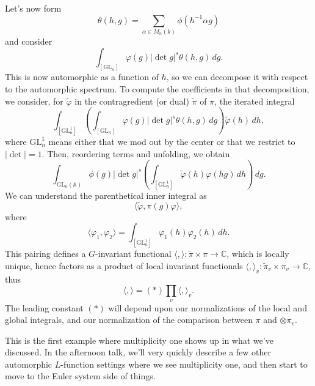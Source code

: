 \documentclass[reqno]{amsart} 
\begin{document}
Let's now form
\begin{equation*}
  \theta(h, g) = \sum_{\alpha \in M_n(k)} \phi(h^{-1} \alpha g)
\end{equation*}
and consider
\begin{equation*}
  \int_{[\mathrm{GL}_n]} \varphi(g) \lvert \det g \rvert^s \theta(h, g) \, d g.
\end{equation*}
This is now automorphic as a function of $h$, so we can decompose it with respect to the automorphic spectrum.  To compute the coefficients in that decomposition, we consider, for $\tilde{\varphi}$ in the contragredient (or dual) $\tilde{\pi}$ of $\pi$, the iterated integral
\begin{equation*}
  \int_{[\mathrm{GL}_n^1]}
  \left(  \int_{[\mathrm{GL}_n]} \varphi(g) \lvert \det g \rvert^s \theta(h, g) \, d g \right)
  \tilde{\varphi}(h) \, d h,
\end{equation*}
where $\mathrm{GL}_n^1$ means either that we mod out by the center or that we restrict to $\lvert \det \rvert = 1$.  Then, reordering terms and unfolding, we obtain
\begin{equation*}
  \int_{\mathrm{GL}_n(\mathbb{A})} \phi(g) \lvert \det g \rvert^s
  \left( \int_{[\mathrm{GL}_n^1]} \tilde{\varphi}(h)
    \varphi(h g) \,d h
  \right) \, d g.
\end{equation*}
We can understand the parenthetical inner integral as
\begin{equation*}
  \langle \tilde{\varphi}, \pi(g) \varphi \rangle,
\end{equation*}
where
\begin{equation*}
  \langle \varphi_1, \varphi_2 \rangle = \int_{[\mathrm{GL}_n^1]} \varphi_1(h) \varphi_2(h) \, d h.
\end{equation*}
This pairing defines a $G$-invariant functional $\langle , \rangle :  \tilde{\pi} \times \pi \rightarrow \mathbb{C}$, which is locally unique, hence factors as a product of local invariant functionals $\langle , \rangle_v : \tilde{\pi}_v \times \pi_v \rightarrow \mathbb{C}$, thus
\begin{equation*}
  \langle , \rangle =(\ast) \prod_v \langle , \rangle_v.
\end{equation*}
The leading constant $(\ast)$ will depend upon our normalizations of the local and global integrals, and our normalization of the comparison between $\pi$ and $\otimes \pi_v$.

This is the first example where multiplicity one shows up in what we've discussed.  In the afternoon talk, we'll very quickly describe a few other automorphic $L$-function settings where we see multiplicity one, and then start to move to the Euler system side of things.
\end{document}
